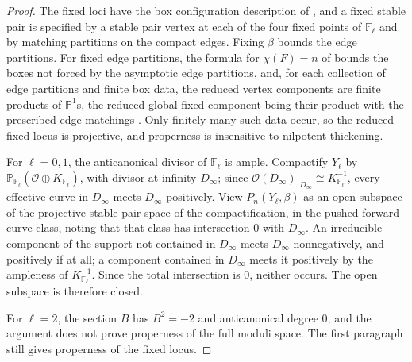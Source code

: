 \documentclass{amsart}
\theoremstyle{definition}
\numberwithin{equation}{section}
\newcommand{\cO}{\mathcal O}
\begin{document}
\begin{proof}
The fixed loci have the box configuration description of \cite[Sections~2.5--2.6]{PandharipandeThomasVertex}, and a fixed stable pair is specified by a stable pair vertex at each of the four fixed points of \(\mathbb F_\ell\) and by matching partitions on the compact edges.  Fixing \(\beta\) bounds the edge partitions.  For fixed edge partitions, the formula for \(\chi(F)=n\) of \cite[Section~2.5]{PandharipandeThomasVertex} bounds the boxes not forced by the asymptotic edge partitions, and, for each collection of edge partitions and finite box data, the reduced vertex components are finite products of \(\mathbb P^1\)s, the reduced global fixed component being their product with the prescribed edge matchings \cite[Propositions~2--3 and Section~2.6]{PandharipandeThomasVertex}.  Only finitely many such data occur, so the reduced fixed locus is projective, and properness is insensitive to nilpotent thickening.

For \(\ell=0,1\), the anticanonical divisor of \(\mathbb F_\ell\) is ample.  Compactify \(Y_\ell\) by \(\mathbb P_{\mathbb F_\ell}(\cO\oplus K_{\mathbb F_\ell})\), with divisor at infinity \(D_\infty\); since \(\cO(D_\infty)|_{D_\infty}\cong K_{\mathbb F_\ell}^{-1}\), every effective curve in \(D_\infty\) meets \(D_\infty\) positively.  View \(P_n(Y_\ell,\beta)\) as an open subspace of the projective stable pair space of the compactification, in the pushed forward curve class, noting that that class has intersection \(0\) with \(D_\infty\).  An irreducible component of the support not contained in \(D_\infty\) meets \(D_\infty\) nonnegatively, and positively if at all; a component contained in \(D_\infty\) meets it positively by the ampleness of \(K_{\mathbb F_\ell}^{-1}\).  Since the total intersection is \(0\), neither occurs.  The open subspace is therefore closed.

For \(\ell=2\), the section \(B\) has \(B^2=-2\) and anticanonical degree \(0\), and the argument does not prove properness of the full moduli space.  The first paragraph still gives properness of the fixed locus.
\end{proof}
\end{document}
